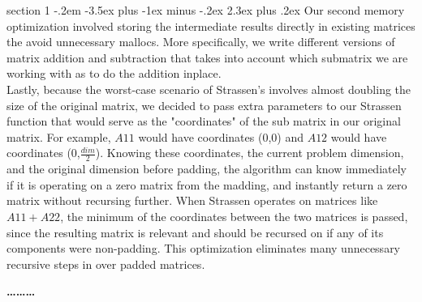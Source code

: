 \documentclass[12pt]{article}
\makeatletter
\newenvironment{problem}{\@startsection
       {section}
       {1}
       {-.2em}
       {-3.5ex plus -1ex minus -.2ex}
       {2.3ex plus .2ex}
       {\pagebreak[3]%
       \large\bf\noindent{Problem }
       }
       }
       {%
       \begin{center}\large\bf \ldots\ldots\ldots\end{center}}
\makeatother
\begin{document}
\begin{problem}{}
\noindent Our second memory optimization involved storing the
intermediate results directly in existing matrices the avoid
unnecessary mallocs. More specifically, we write different versions of
matrix addition and subtraction that takes into account which
submatrix we are working with as to do the addition inplace.\\

\noindent Lastly, because the worst-case scenario of Strassen's involves almost doubling the size of the original matrix, we decided to pass extra parameters to our Strassen function that would serve as the "coordinates" of the sub matrix in our original matrix.  For example, $A11$ would have coordinates (0,0) and $A12$ would have coordinates (0,$\frac{dim}{2}$).  Knowing these coordinates, the current problem dimension, and the original dimension before padding, the algorithm can know immediately if it is operating on a zero matrix from the madding, and instantly return a zero matrix without recursing further.  When Strassen operates on matrices like $A11+A22$, the minimum of the coordinates between the two matrices is passed, since the resulting matrix is relevant and should be recursed on if any of its components were non-padding.  This optimization eliminates many unnecessary recursive steps in over padded matrices.

\end{problem}{}
\end{document}
